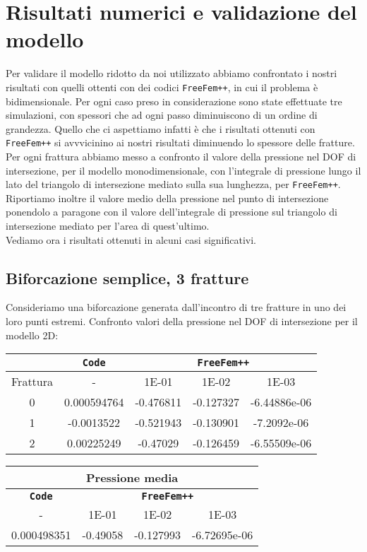 \chapter{Risultati numerici e validazione del modello} 
Per validare il modello ridotto da noi utilizzato abbiamo confrontato i nostri risultati con quelli ottenti con dei codici \texttt{FreeFem++}, in cui il problema è bidimensionale. Per ogni caso preso in considerazione sono state effettuate tre simulazioni, con spessori che ad ogni passo diminuiscono di un ordine di grandezza. Quello che ci aspettiamo infatti \`{e} che i risultati ottenuti con \texttt{FreeFem++}  si avvvicinino ai nostri risultati diminuendo lo spessore delle fratture.\\
\noindent Per ogni frattura abbiamo messo a confronto il valore della pressione nel DOF di intersezione, per il modello monodimensionale, con l'integrale di pressione lungo il lato del triangolo di intersezione mediato sulla sua lunghezza, per \texttt{FreeFem++}.
Riportiamo inoltre il valore medio della pressione nel punto di intersezione ponendolo a paragone con il valore dell'integrale di pressione sul triangolo di intersezione mediato per l'area di quest'ultimo.\\
Vediamo ora i risultati ottenuti in alcuni casi significativi.
\section{Biforcazione semplice, 3 fratture}
Consideriamo una biforcazione generata dall'incontro di tre fratture in uno dei loro punti estremi.
Confronto valori della pressione nel DOF di intersezione per il modello 2D:\\
\begin{center}
\begin{tabular}{|c|c|c|c|c|}
\hline
 & \textbf{\texttt{Code}} & \multicolumn{3}{|c|}{\textbf{\texttt{FreeFem++}}} \\
\hline
\multicolumn{1}{|c|}{Frattura} & - &
\multicolumn{1}{|c|}{1E-01} & 1E-02 & 1E-03 \\
\hline
 0 & 0.000594764 & -0.476811 & -0.127327 & -6.44886e-06\\
 1 & -0.0013522 & -0.521943 & -0.130901 & -7.2092e-06\\
 2 & 0.00225249 & -0.47029 & -0.126459 & -6.55509e-06\\
\hline
\end{tabular}
\end{center}

\begin{center}
\begin{tabular}{|c|c|c|c|}
\hline
\multicolumn{4}{|c|}{Pressione media} \\
\hline
\textbf{\texttt{Code}} & \multicolumn{3}{|c|}{\textbf{\texttt{FreeFem++}}} \\
\hline
- & \multicolumn{1}{|c|}{1E-01} & 1E-02 & 1E-03 \\
\hline
0.000498351 & -0.49058 & -0.127993 & -6.72695e-06 \\
\hline
\end{tabular}
\end{center}

